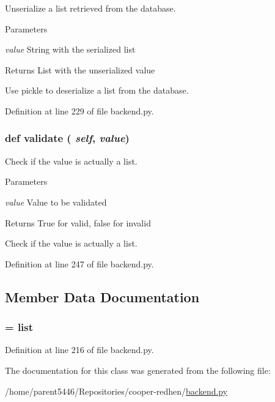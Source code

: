 Unserialize a list retrieved from the database. 


\begin{DoxyParams}{Parameters}
\item[{\em value}]String with the serialized list \end{DoxyParams}
\begin{DoxyReturn}{Returns}
List with the unserialized value\begin{DoxyVerb}Use pickle to deserialize a list from the database.\end{DoxyVerb}
 
\end{DoxyReturn}


Definition at line 229 of file backend.py.

\hypertarget{classbackend_1_1_generic_list_property_a8f3dc5c8aaf85c281c2f52cda259aa56}{
\subsubsection[{validate}]{\setlength{\rightskip}{0pt plus 5cm}def validate ( {\em self}, \/   {\em value})}}
\label{classbackend_1_1_generic_list_property_a8f3dc5c8aaf85c281c2f52cda259aa56}


Check if the value is actually a list. 


\begin{DoxyParams}{Parameters}
\item[{\em value}]Value to be validated \end{DoxyParams}
\begin{DoxyReturn}{Returns}
True for valid, false for invalid\begin{DoxyVerb}Check if the value is actually a list.\end{DoxyVerb}
 
\end{DoxyReturn}


Definition at line 247 of file backend.py.



\subsection{Member Data Documentation}
\hypertarget{classbackend_1_1_generic_list_property_ac2ad7f431e3446fddcd9b6b9f93c4c14}{
\subsubsection[{data\_\-type}]{ = list}}
\label{classbackend_1_1_generic_list_property_ac2ad7f431e3446fddcd9b6b9f93c4c14}


Definition at line 216 of file backend.py.



The documentation for this class was generated from the following file:\begin{DoxyCompactItemize}
\item 
/home/parent5446/Repositories/cooper-\/redhen/\hyperlink{backend_8py}{backend.py}\end{DoxyCompactItemize}
